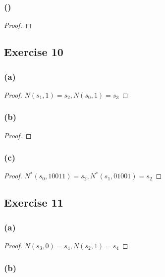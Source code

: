 \documentclass[14pt]{extarticle}
\begin{document}
\subsubsection{()}

\begin{proof}

\end{proof}

\subsection{Exercise 10}

\subsubsection{(a)}

\begin{proof}
\(N(s_1, 1) = s_2, N(s_0, 1) = s_3\)
\end{proof}

\subsubsection{(b)}

\begin{proof}

\end{proof}

\subsubsection{(c)}

\begin{proof}
\(N^*(s_0, 10011) = s_2, N^*(s_1, 01001) = s_2\)
\end{proof}

\subsection{Exercise 11}

\subsubsection{(a)}

\begin{proof}
\(N(s_3, 0) = s_4, N(s_2, 1) = s_4\)
\end{proof}

\subsubsection{(b)}
\end{document}
